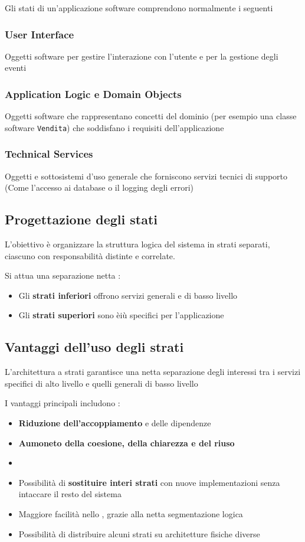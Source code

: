 Gli stati di un'applicazione software comprendono normalmente i seguenti

\subsubsection{User Interface}
Oggetti software per gestire l'interazione con l'utente e per la gestione degli eventi

\subsubsection{Application Logic e Domain Objects}
Oggetti software che rappresentano concetti del dominio (per esempio una classe software \texttt{Vendita}) che soddisfano i requisiti dell'applicazione

\subsubsection{Technical Services}
Oggetti e sottosistemi d'uso generale che forniscono servizi tecnici di supporto (Come l'accesso ai database o il logging degli errori)

\subsection{Progettazione degli stati}
L'obiettivo è organizzare la struttura logica del sistema in strati separati, ciascuno con responsabilità distinte e correlate.


Si attua una separazione netta :
\begin{itemize}
    \item Gli \textbf{strati inferiori} offrono servizi generali e di basso livello
    \item Gli \textbf{strati superiori} sono èiù specifici per l'applicazione
\end{itemize}
\subsection{Vantaggi dell'uso degli strati}
L'architettura a strati garantisce una netta separazione degli interessi tra i servizi specifici di alto livello e quelli generali di basso livello

\vspace{\baselineskip}
I vantaggi principali includono :
\begin{itemize}
    \item \textbf{Riduzione dell'accoppiamento }e delle dipendenze
    \item \textbf{Aumoneto della coesione, della chiarezza e del riuso}
    \item {}
    \item Possibilità di \textbf{sostituire interi strati} con nuove implementazioni senza intaccare il resto del sistema
    \item Maggiore facilità nello , grazie alla netta segmentazione logica
    \item Possibilità di distribuire alcuni strati su architetture fisiche diverse
\end{itemize}
